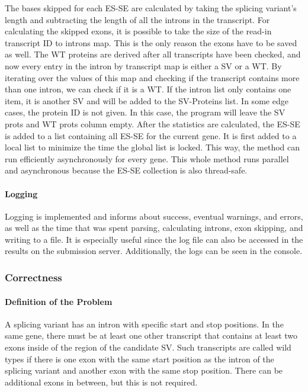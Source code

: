 \documentclass{article}
\begin{document}
    The bases skipped for each ES-SE are calculated by taking the splicing variant's length and subtracting the length of all the introns in the transcript. For calculating the skipped exons, it is possible to take the size of the read-in transcript ID to introns map. This is the only reason the exons have to be saved as well. The WT proteins are derived after all transcripts have been checked, and now every entry in the intron by transcript map is either a SV or a WT. By iterating over the values of this map and checking if the transcript contains more than one intron, we can check if it is a WT. If the intron list only contains one item, it is another SV and will be added to the SV-Proteins list. In some edge cases, the protein ID is not given. In this case, the program will leave the SV prots and WT prots column empty. After the statistics are calculated, the ES-SE is added to a list containing all ES-SE for the current gene. It is first added to a local list to minimize the time the global list is locked. This way, the method can run efficiently asynchronously for every gene. This whole method runs parallel and asynchronous because the ES-SE collection is also thread-safe.

    \paragraph{Logging} Logging is implemented and informs about success, eventual warnings, and errors, as well as the time that was spent parsing, calculating introns, exon skipping, and writing to a file. It is especially useful since the log file can also be accessed in the results on the submission server. Additionally, the logs can be seen in the console.

    \subsubsection{Correctness}

    \paragraph{Definition of the Problem}
    A splicing variant has an intron with specific start and stop positions. In the same gene, there must be at least one other transcript that contains at least two exons inside of the region of the candidate SV. Such transcripts are called wild types if there is one exon with the same start position as the intron of the splicing variant and another exon with the same stop position. There can be additional exons in between, but this is not required.
\end{document}
